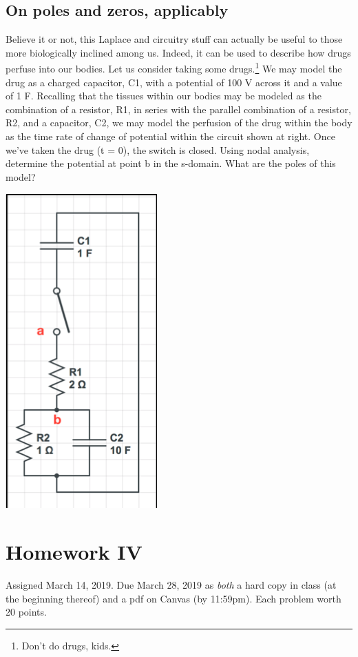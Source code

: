 \documentclass[11pt]{book}
\begin{document}
\section{On poles and zeros, applicably}
Believe it or not, this Laplace and circuitry stuff can actually be useful to those more biologically inclined among us. Indeed, it can be used to describe how drugs perfuse into our bodies. Let us consider taking some drugs.\footnote{Don't do drugs, kids.}  We may model the drug as a charged capacitor, C1, with a potential of 100 V across it and a value of 1 F. Recalling that the tissues within our bodies may be modeled as the combination of a resistor, R1, in series with the parallel combination of a resistor, R2, and a capacitor, C2, we may model the perfusion of the drug within the body as the time rate of change of potential within the circuit shown at right. Once we’ve taken the drug (t = 0), the switch is closed. Using nodal analysis, determine the potential at point b in the s-domain. What are the poles of this model? 
\begin{center}
	\includegraphics{figures/hw3.02.png}
\end{center}

\chapter*{Homework IV}
Assigned March 14, 2019. Due March 28, 2019 as \textit{both} a hard copy in class (at the beginning thereof) and a pdf on Canvas (by 11:59pm). Each problem worth 20 points.
\setcounter{chapter}{4}
\setcounter{section}{0}
\end{document}
